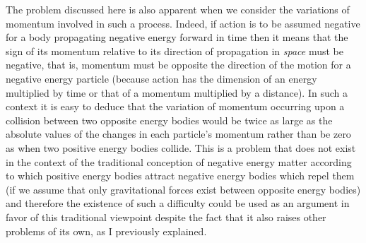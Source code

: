 \documentclass[notitlepage,12pt]{report}
\begin{document}
The problem discussed here is also apparent when we consider the variations of momentum involved in such a process. Indeed, if action is to be assumed negative for a body propagating negative energy forward in time then it means that the sign of its momentum relative to its direction of propagation in \textit{space} must be negative, that is, momentum must be opposite the direction of the motion for a negative energy particle (because action has the dimension of an energy multiplied by time or that of a momentum multiplied by a distance). In such a context it is easy to deduce that the variation of momentum occurring upon a collision between two opposite energy bodies would be twice as large as the absolute values of the changes in each particle's momentum rather than be zero as when two positive energy bodies collide. This is a problem that does not exist in the context of the traditional conception of negative energy matter according to which positive energy bodies attract negative energy bodies which repel them (if we assume that only gravitational forces exist between opposite energy bodies) and therefore the existence of such a difficulty could be used as an argument in favor of this traditional viewpoint despite the fact that it also raises other problems of its own, as I previously explained.
\end{document}
